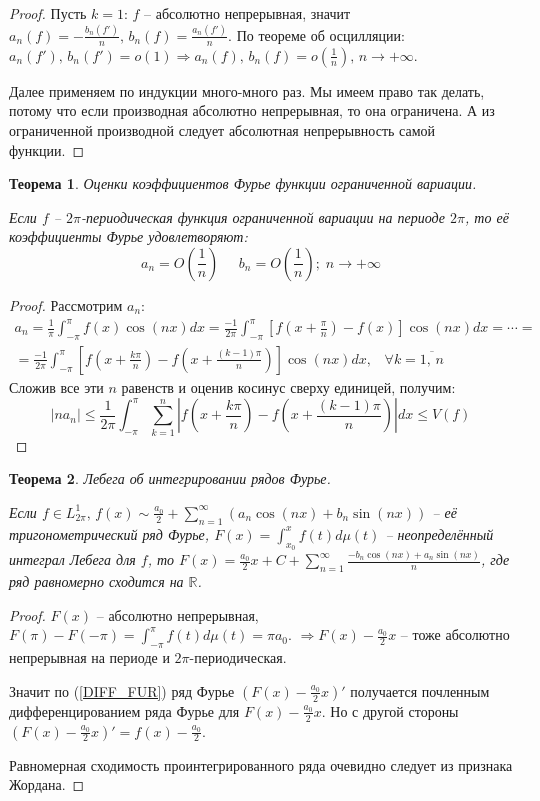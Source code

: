 \documentclass[a4paper,12pt]{article}
\renewcommand{\leq}{\ensuremath{\leqslant}}
\theoremstyle{plain}
\newtheorem{theorem}{Теорема}[section]
\theoremstyle{definition}
\theoremstyle{remark}
\begin{document}
\begin{proof}
	Пусть $k = 1$: $f$ -- абсолютно непрерывная, значит $a_n(f) = -\frac{b_n(f')}{n},\, b_n(f) = \frac{a_n(f')}{n}$. По теореме об осцилляции: $a_n(f'),\, b_n(f') = o(1) \Rightarrow a_n(f),\,b_n(f) = o\left(\frac{1}{n}\right),\, n \to +\infty$.

	Далее применяем по индукции много-много раз. Мы имеем право так делать, потому что если производная абсолютно непрерывная, то она ограничена. А из ограниченной производной следует абсолютная непрерывность самой функции.
\end{proof}

\begin{theorem}
	Оценки коэффициентов Фурье функции ограниченной вариации.

	Если $f$ -- $2\pi$-периодическая функция ограниченной вариации на периоде $2\pi$, то её коэффициенты Фурье удовлетворяют:
	\[a_n = O\left(\frac{1}{n}\right)\;\;\;\;\; b_n = O\left(\frac{1}{n}\right);\; n \to +\infty\]
\end{theorem}

\begin{proof}
	Рассмотрим $a_n$:
	\begin{align*}
		a_n = \frac{1}{\pi}\int_{-\pi}^\pi f(x)\cos(nx)dx = \frac{-1}{2\pi}\int_{-\pi}^\pi \left[f(x + \frac{\pi}{n}) - f(x)\right]\cos(nx)dx = \cdots = \\
		= \frac{-1}{2\pi}\int_{-\pi}^\pi \left[f\left(x + \frac{k\pi}{n}\right) - f\left(x + \frac{(k - 1)\pi}{n}\right)\right]\cos(nx)dx,\;\;\; \forall k = \overline{1,\,n}
	\end{align*}
	Сложив все эти $n$ равенств и оценив косинус сверху единицей, получим:
	\[
		|na_n| \leq \frac{1}{2\pi} \int_{-\pi}^\pi \sum_{k = 1}^n \left|f\left(x + \frac{k\pi}{n}\right) - f\left(x + \frac{(k - 1)\pi}{n}\right)\right|dx \leq V(f)
	\]
\end{proof}

\begin{theorem}
	Лебега об интегрировании рядов Фурье.

	Если $f \in L^1_{2\pi},\, f(x) \sim \frac{a_0}{2} + \sum_{n = 1}^\infty (a_n\cos(nx) + b_n\sin(nx))$ -- её тригонометрический ряд Фурье, $F(x) = \int_{x_0}^x f(t)d\mu(t)$ -- неопределённый интеграл Лебега для $f$, то $F(x) = \frac{a_0}{2}x + C + \sum_{n = 1}^\infty \frac{-b_n\cos(nx) + a_n\sin(nx)}{n}$, где ряд равномерно сходится на $\mathbb{R}$.
\end{theorem}

\begin{proof}
	$F(x)$ -- абсолютно непрерывная, $F(\pi) - F(-\pi) = \int_{-\pi}^\pi f(t)d\mu(t) = \pi a_0$. $\Rightarrow F(x) - \frac{a_0}{2}x$ -- тоже абсолютно непрерывная на периоде и $2\pi$-периодическая.

	Значит по (\ref{DIFF_FUR}) ряд Фурье $\left(F(x) - \frac{a_0}{2}x\right)'$ получается почленным дифференцированием ряда Фурье для $F(x) - \frac{a_0}{2}x$. Но с другой стороны $\left(F(x) - \frac{a_0}{2}x\right)' = f(x) - \frac{a_0}{2}$.

	Равномерная сходимость проинтегрированного ряда очевидно следует из признака Жордана.
\end{proof}
\end{document}
